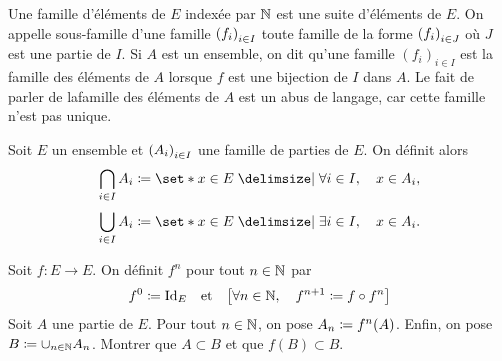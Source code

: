 \documentclass{magnoliaold}
\begin{document}
\begin{remarques}
\remarque Une famille d'éléments de $E$ indexée par $\mathbb{N}$ est une suite d'éléments de $E$.
\remarque On appelle sous-famille d'une famille $\left(f_i\right)_{i\in I}$ toute famille
  de la forme $\left(f_i\right)_{i\in J}$ où $J$ est une partie de $I$.
\remarque Si $A$ est un ensemble, on dit qu'une famille $(f_i)_{i\in I}$ est la famille des éléments de $A$ lorsque $f$ est une bijection de $I$ dans $A$. Le fait de parler de \og la\fg famille des éléments de $A$ est un abus de langage, car cette famille n'est pas unique.
\end{remarques}


\begin{definition}[utile=-3]
Soit $E$ un ensemble et $\left(A_i\right)_{i\in I}$ une famille de parties de $E$. On
définit alors
\[\bigcap\limits_{i\in I} A_i\defeq \enstq{x\in E}{\forall i\in I \qsep x\in A_i},\]
\[\bigcup\limits_{i\in I} A_i\defeq \enstq{x\in E}{\exists i\in I \qsep x\in A_i}.\]
\end{definition}


\begin{exoUnique}
\exo Soit $f:E\to E$. On définit $f^n$ pour tout $n\in\mathbb{N}$ par
  \[f^0\coloneqq \operatorname{Id}_E \quad\!\text{et}\quad\! \left[\forall n\in\mathbb{N} ,\quad f^{n+1}\coloneqq f\circ f^n\right]\]
  Soit $A$ une partie de $E$. Pour tout $n\in\mathbb{N}$, on pose $A_n\coloneqq f^n(A)$.
  Enfin, on pose $B\coloneqq \cup_{n\in\mathbb{N}} A_n$. Montrer que $A\subset B$ et que
  $f(B)\subset B$.
\end{exoUnique}
\end{document}
